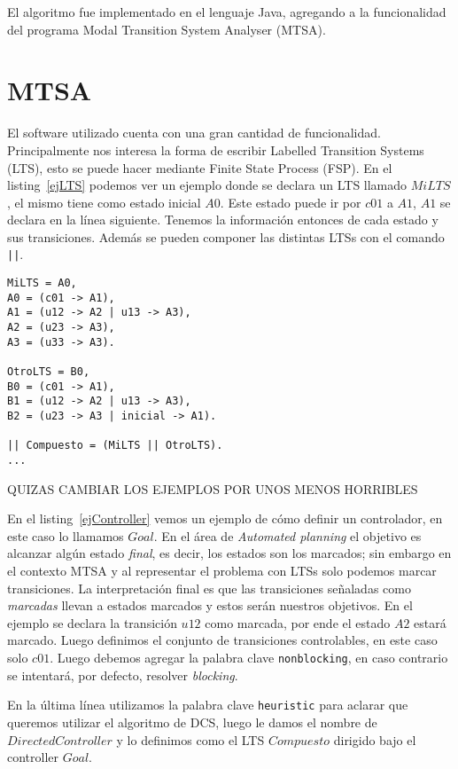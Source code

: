 
El algoritmo fue implementado en el lenguaje Java, agregando a la funcionalidad del programa Modal Transition System Analyser (MTSA)\cite{mtsaRepo}.

\section{MTSA}
El software utilizado cuenta con una gran cantidad de funcionalidad. Principalmente nos interesa la forma de escribir Labelled Transition Systems (LTS), esto se puede hacer mediante Finite State Process (FSP). En el listing~\ref{ejLTS} podemos ver un ejemplo donde se declara un LTS llamado $MiLTS$, el mismo tiene como estado inicial $A0$. Este estado puede ir por $c01$ a $A1$, $A1$ se declara en la línea siguiente. Tenemos la información entonces de cada estado y sus transiciones. Además se pueden componer las distintas LTSs con el comando \texttt{||}.

\begin{lstlisting}[language = mtsa, caption=Ejemplo de LTS y composición, label=ejLTS]
MiLTS = A0,
A0 = (c01 -> A1),
A1 = (u12 -> A2 | u13 -> A3),
A2 = (u23 -> A3),
A3 = (u33 -> A3).

OtroLTS = B0,
B0 = (c01 -> A1),
B1 = (u12 -> A2 | u13 -> A3),
B2 = (u23 -> A3 | inicial -> A1).

|| Compuesto = (MiLTS || OtroLTS).
...
\end{lstlisting}
QUIZAS CAMBIAR LOS EJEMPLOS POR UNOS MENOS HORRIBLES

En el listing~\ref{ejController} vemos un ejemplo de cómo definir un controlador, en este caso lo llamamos $Goal$. En el área de \textit{Automated planning} el objetivo es alcanzar algún estado \textit{final}, es decir, los estados son los marcados; sin embargo en el contexto MTSA y al representar el problema con LTSs solo podemos marcar transiciones. La interpretación final es que las transiciones señaladas como \textit{marcadas} llevan a estados marcados y estos serán nuestros objetivos. En el ejemplo se declara la transición $u12$ como marcada, por ende el estado $A2$ estará marcado. Luego definimos el conjunto de transiciones controlables, en este caso solo $c01$. Luego debemos agregar la palabra clave \texttt{nonblocking}, en caso contrario se intentará, por defecto, resolver \textit{blocking}.

En la última línea utilizamos la palabra clave \texttt{heuristic} para aclarar que queremos utilizar el algoritmo de DCS, luego le damos el nombre de $DirectedController$ y lo definimos como el LTS $Compuesto$ dirigido bajo el controller $Goal$.

